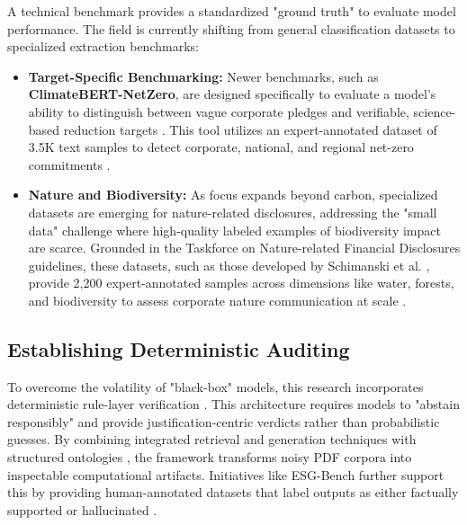 \documentclass[english, online, cse, master]{dithesis}
\begin{document}
A technical benchmark provides a standardized "ground truth" to evaluate model performance. The field is currently shifting from general classification datasets to specialized extraction benchmarks:
\begin{itemize}
\item 

\textbf{Target-Specific Benchmarking:} Newer benchmarks, such as \textbf{ClimateBERT-NetZero}, are designed specifically to evaluate a model’s ability to distinguish between vague corporate pledges and verifiable, science-based reduction targets  \parencite{tobias_schimanski_241ada20}. This tool utilizes an expert-annotated dataset of 3.5K text samples to detect corporate, national, and regional net-zero commitments  \parencite{tobias_schimanski_241ada20}.\item 

\textbf{Nature and Biodiversity:} As focus expands beyond carbon, specialized datasets are emerging for nature-related disclosures, addressing the "small data" challenge where high-quality labeled examples of biodiversity impact are scarce. Grounded in the Taskforce on Nature-related Financial Disclosures guidelines, these datasets, such as those developed by Schimanski et al.  \parencite{tobias_schimanski_3549ff9f}, provide 2,200 expert-annotated samples across dimensions like water, forests, and biodiversity to assess corporate nature communication at scale  \parencite{tobias_schimanski_3549ff9f}.
\end{itemize}


\subsection{Establishing Deterministic Auditing}

To overcome the volatility of "black-box" models, this research incorporates deterministic rule-layer verification  \parencite{steven_paul_nohr_a6874924}. This architecture requires models to "abstain responsibly" and provide justification-centric verdicts rather than probabilistic guesses. By combining integrated retrieval and generation techniques  \parencite[]{g_saipooja_m_n_488bfdd6, tanay_gupta_aafe0c6a} with structured ontologies  \parencite{kaoukis__georgios_35bab107}, the framework transforms noisy PDF corpora into inspectable computational artifacts. Initiatives like ESG-Bench further support this by providing human-annotated datasets that label outputs as either factually supported or hallucinated  \parencite[]{siqi_sun_c8f93141, association_for_artificial_intelligence_2026_86e12eae}.
     
\end{document}
